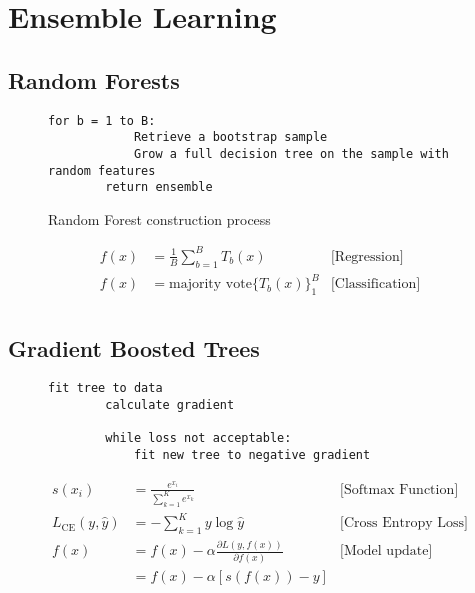 \section{Ensemble Learning}

\subsection{Random Forests}

\begin{figure}[h]
    \begin{lstlisting}[gobble=8]
        for b = 1 to B:
            Retrieve a bootstrap sample
            Grow a full decision tree on the sample with random features
        return ensemble 
    \end{lstlisting}
    \caption{Random Forest construction process}
\end{figure}

\begin{align*}
    f(x) &= \frac{1}{B}\sum^{B}_{b=1} T_b(x) & \text{[Regression]}\\
    f(x) &= \text{majority vote} \{T_b(x)\}^{B}_{1} & \text{[Classification]}\\
\end{align*}

\subsection{Gradient Boosted Trees}

\begin{figure}[h]
    \begin{lstlisting}[gobble=8]
        fit tree to data
        calculate gradient

        while loss not acceptable:
            fit new tree to negative gradient
    \end{lstlisting}
\end{figure}

\begin{align*}
    s(x_i) &= \frac{e^{x_i}}{\sum^K_{k=1} e^{x_k}} & \text{[Softmax Function]}\\
    L_{\text{CE}} (y, \hat{y}) &= -\sum^K_{k=1} y \log \hat{y}& \text{[Cross Entropy Loss]}\\
    f(x) &= f(x) - \alpha \frac{\partial L(y, f(x))}{\partial f(x)} & \text{[Model update]}\\
    &= f(x) - \alpha \left[s(f(x)) - y\right]&\\
\end{align*}

